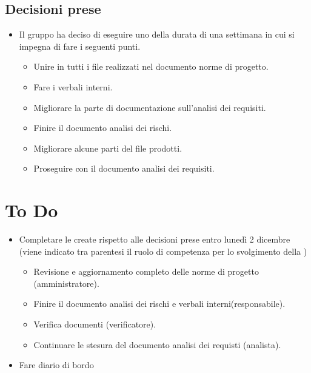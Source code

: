 \documentclass[a4paper, 12pt]{article}
\begin{document}
\subsection{Decisioni prese}
\begin{itemize}
    \item Il gruppo ha deciso di eseguire uno  della durata di una settimana in cui si impegna di fare i seguenti punti.
    \begin{itemize}
        \item Unire in  tutti i file realizzati nel documento norme di progetto.
        \item Fare i verbali interni.
        \item Migliorare la parte di documentazione sull'analisi dei requisiti.
        \item Finire il documento analisi dei rischi.
        \item Migliorare alcune parti del file prodotti.
        \item Proseguire con il documento analisi dei requisiti.
    \end{itemize}
\end{itemize}

\section{To Do}
    \begin{itemize}
        \item Completare le  create rispetto alle decisioni prese entro lunedì 2 dicembre (viene indicato tra parentesi il ruolo di competenza per lo svolgimento della )
        \begin{itemize}
            \item Revisione e aggiornamento completo delle norme di progetto (amministratore).
            \item Finire il documento analisi dei rischi e verbali interni(responsabile).
            \item Verifica documenti (verificatore).
            \item Continuare le stesura del documento analisi dei requisti (analista).
        \end{itemize}
        \item Fare diario di bordo
    \end{itemize}
\end{document}
